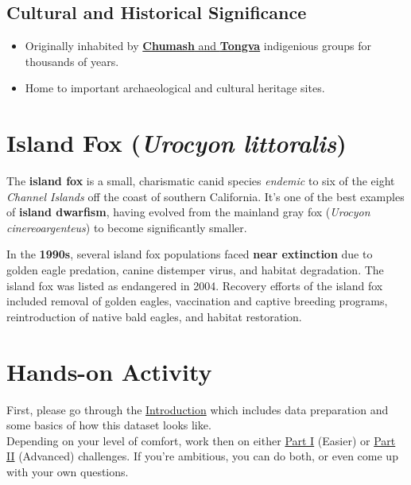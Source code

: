 \documentclass[
  letterpaper,
]{report}
\providecommand{\tightlist}{%
  \setlength{\itemsep}{0pt}\setlength{\parskip}{0pt}}\usepackage{longtable,booktabs,array}
\begin{document}
\subsection{Cultural and Historical
Significance}\label{cultural-and-historical-significance}

\begin{itemize}
\tightlist
\item
  Originally inhabited by
  \href{https://www.nps.gov/chis/learn/historyculture/nativeinhabitants.htm\#:~:text=With\%20a\%20current\%20population\%20nearly,organized\%20Chumash\%20tribal\%20groups\%20exist}{\textbf{Chumash}
  and \textbf{Tongva}} indigenious groups for thousands of years.
\item
  Home to important archaeological and cultural heritage sites.
\end{itemize}

\section{\texorpdfstring{Island Fox (\emph{Urocyon
littoralis})}{Island Fox (Urocyon littoralis)}}\label{island-fox-urocyon-littoralis}

The \textbf{island fox} is a small, charismatic canid species
\emph{endemic} to six of the eight \emph{Channel Islands} off the coast
of southern California. It's one of the best examples of \textbf{island
dwarfism}, having evolved from the mainland gray fox (\emph{Urocyon
cinereoargenteus}) to become significantly smaller.

In the \textbf{1990s}, several island fox populations faced \textbf{near
extinction} due to golden eagle predation, canine distemper virus, and
habitat degradation. The island fox was listed as endangered in 2004.
Recovery efforts of the island fox included removal of golden eagles,
vaccination and captive breeding programs, reintroduction of native bald
eagles, and habitat restoration.

\section{Hands-on Activity}\label{hands-on-activity}

First, please go through the \hyperref[intro]{Introduction} which
includes data preparation and some basics of how this dataset looks
like.\\
Depending on your level of comfort, work then on either
\hyperref[part1]{Part I} (Easier) or \hyperref[part2]{Part II}
(Advanced) challenges. If you're ambitious, you can do both, or even
come up with your own questions.
\end{document}
